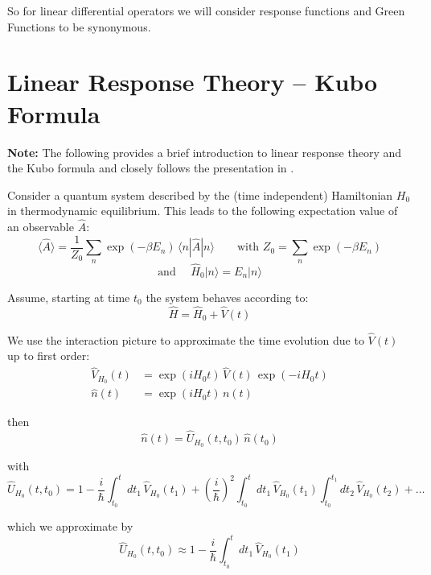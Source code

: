 So for linear differential operators we will consider response functions and Green Functions to be synonymous.

\section{Linear Response Theory -- Kubo Formula}

\textbf{Note:} The following provides a brief introduction to linear response theory and the Kubo formula
and closely follows the presentation in \cite{bruus_flensberg_many-body_2002}.

Consider a quantum system described by the (time independent) Hamiltonian $H_0$ in thermodynamic equilibrium. This leads to the following expectation value of an observable $\hat{A}$:
\begin{equation*}
    \langle \hat{A} \rangle = \frac{1}{Z_0} \sum_n \exp(-\beta E_n)\, \langle n | \hat{A} | n \rangle
    \qquad \text{with } Z_0 = \sum_n \exp(-\beta E_n)
\end{equation*}
\begin{equation*}
    \text{and } \quad \hat{H}_0 | n \rangle = E_n | n \rangle
\end{equation*}

Assume, starting at time $t_0$ the system behaves according to:
\begin{equation*}
    \hat{H} = \hat{H}_0 + \hat{V}(t)
\end{equation*}

We use the interaction picture to approximate the time evolution due to $\hat{V}(t)$ up to first order:
\begin{align*}
    \hat{V}_{H_0}(t) &= \exp(i H_0 t)\, \hat{V}(t)\, \exp(-i H_0 t) \\
    \hat{n}(t) &= \exp(i H_0 t)\, n(t)
\end{align*}

then
\begin{equation*}
    \hat{n}(t) = \hat{U}_{H_0}(t,t_0)\, \hat{n}(t_0)
\end{equation*}

with
\begin{equation*}
    \hat{U}_{H_0}(t,t_0) = 1 - \frac{i}{\hbar} \int_{t_0}^{t} dt_1\, \hat{V}_{H_0}(t_1)
    + \left(\frac{i}{\hbar}\right)^2 \int_{t_0}^{t} dt_1\, \hat{V}_{H_0}(t_1) \int_{t_0}^{t_1} dt_2\, \hat{V}_{H_0}(t_2) + \dots
\end{equation*}

which we approximate by
\begin{equation*}
    \hat{U}_{H_0}(t,t_0) \approx 1 - \frac{i}{\hbar} \int_{t_0}^{t} dt_1\, \hat{V}_{H_0}(t_1)
\end{equation*}

